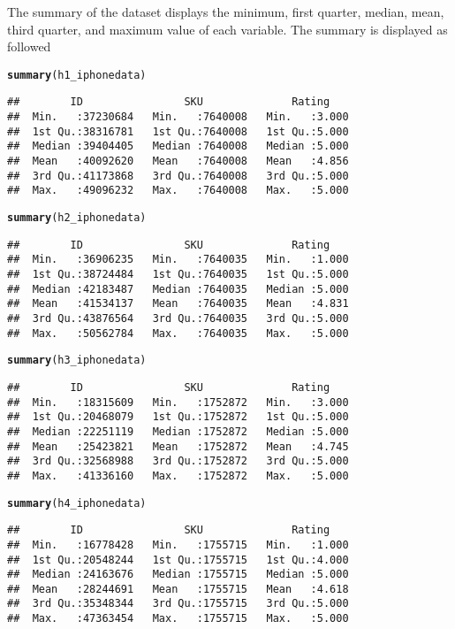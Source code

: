 \documentclass{article}\usepackage[]{graphicx}\usepackage[]{color}
\makeatletter
\newcommand{\hlstd}[1]{\textcolor[rgb]{0.345,0.345,0.345}{#1}}%
\newcommand{\hlkwd}[1]{\textcolor[rgb]{0.737,0.353,0.396}{\textbf{#1}}}%
\newenvironment{kframe}{%
 \def\at@end@of@kframe{}%
 \ifinner\ifhmode%
  \def\at@end@of@kframe{\end{minipage}}%
  \begin{minipage}{\columnwidth}%
 \fi\fi%
 \def\FrameCommand##1{\hskip\@totalleftmargin \hskip-\fboxsep
 \colorbox{shadecolor}{##1}\hskip-\fboxsep
     \hskip-\linewidth \hskip-\@totalleftmargin \hskip\columnwidth}%
 \MakeFramed {\advance\hsize-\width
   \@totalleftmargin\z@ \linewidth\hsize
   \@setminipage}}%
 {\par\unskip\endMakeFramed%
 \at@end@of@kframe}
\newenvironment{knitrout}{}{} %
\makeatother
\begin{document}
The summary of the dataset displays the minimum, first quarter, median,
mean, third quarter, and maximum value of each variable. The summary is
displayed as followed
\begin{knitrout}
\color{fgcolor}\begin{kframe}
\begin{alltt}
\hlkwd{summary}\hlstd{(h1_iphonedata)}
\end{alltt}
\begin{verbatim}
##        ID                SKU              Rating     
##  Min.   :37230684   Min.   :7640008   Min.   :3.000  
##  1st Qu.:38316781   1st Qu.:7640008   1st Qu.:5.000  
##  Median :39404405   Median :7640008   Median :5.000  
##  Mean   :40092620   Mean   :7640008   Mean   :4.856  
##  3rd Qu.:41173868   3rd Qu.:7640008   3rd Qu.:5.000  
##  Max.   :49096232   Max.   :7640008   Max.   :5.000
\end{verbatim}
\begin{alltt}
\hlkwd{summary}\hlstd{(h2_iphonedata)}
\end{alltt}
\begin{verbatim}
##        ID                SKU              Rating     
##  Min.   :36906235   Min.   :7640035   Min.   :1.000  
##  1st Qu.:38724484   1st Qu.:7640035   1st Qu.:5.000  
##  Median :42183487   Median :7640035   Median :5.000  
##  Mean   :41534137   Mean   :7640035   Mean   :4.831  
##  3rd Qu.:43876564   3rd Qu.:7640035   3rd Qu.:5.000  
##  Max.   :50562784   Max.   :7640035   Max.   :5.000
\end{verbatim}
\begin{alltt}
\hlkwd{summary}\hlstd{(h3_iphonedata)}
\end{alltt}
\begin{verbatim}
##        ID                SKU              Rating     
##  Min.   :18315609   Min.   :1752872   Min.   :3.000  
##  1st Qu.:20468079   1st Qu.:1752872   1st Qu.:5.000  
##  Median :22251119   Median :1752872   Median :5.000  
##  Mean   :25423821   Mean   :1752872   Mean   :4.745  
##  3rd Qu.:32568988   3rd Qu.:1752872   3rd Qu.:5.000  
##  Max.   :41336160   Max.   :1752872   Max.   :5.000
\end{verbatim}
\begin{alltt}
\hlkwd{summary}\hlstd{(h4_iphonedata)}
\end{alltt}
\begin{verbatim}
##        ID                SKU              Rating     
##  Min.   :16778428   Min.   :1755715   Min.   :1.000  
##  1st Qu.:20548244   1st Qu.:1755715   1st Qu.:4.000  
##  Median :24163676   Median :1755715   Median :5.000  
##  Mean   :28244691   Mean   :1755715   Mean   :4.618  
##  3rd Qu.:35348344   3rd Qu.:1755715   3rd Qu.:5.000  
##  Max.   :47363454   Max.   :1755715   Max.   :5.000
\end{verbatim}
\end{kframe}
\end{knitrout}
\end{document}
